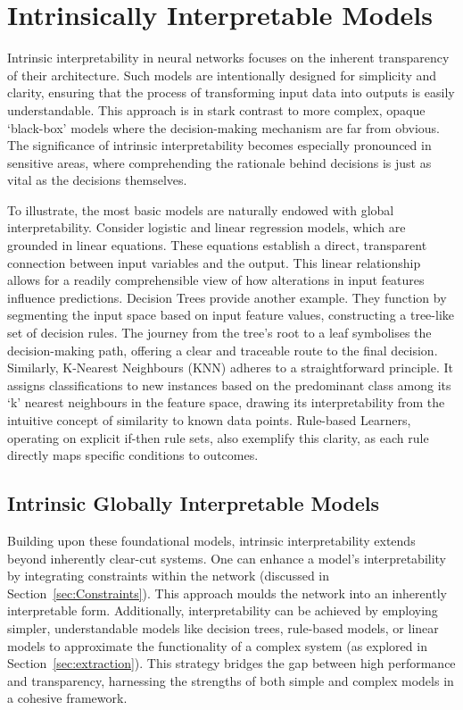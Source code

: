 \section{Intrinsically Interpretable Models}

Intrinsic interpretability in neural networks focuses on the inherent transparency of their architecture. Such models are intentionally designed for simplicity and clarity, ensuring that the process of transforming input data into outputs is easily understandable. This approach is in stark contrast to more complex, opaque `black-box' models where the decision-making mechanism are far from obvious. The significance of intrinsic interpretability becomes especially pronounced in sensitive areas, where comprehending the rationale behind decisions is just as vital as the decisions themselves.

To illustrate, the most basic models are naturally endowed with global interpretability. Consider logistic and linear regression models, which are grounded in linear equations. These equations establish a direct, transparent connection between input variables and the output. This linear relationship allows for a readily comprehensible view of how alterations in input features influence predictions. Decision Trees provide another example. They function by segmenting the input space based on input feature values, constructing a tree-like set of decision rules. The journey from the tree's root to a leaf symbolises the decision-making path, offering a clear and traceable route to the final decision. Similarly, K-Nearest Neighbours (KNN) adheres to a straightforward principle. It assigns classifications to new instances based on the predominant class among its `k' nearest neighbours in the feature space, drawing its interpretability from the intuitive concept of similarity to known data points. Rule-based Learners, operating on explicit if-then rule sets, also exemplify this clarity, as each rule directly maps specific conditions to outcomes.

\subsection{Intrinsic Globally Interpretable Models}
\label{sec:Intrinsic}

Building upon these foundational models, intrinsic interpretability extends beyond inherently clear-cut systems. One can enhance a model's interpretability by integrating constraints within the network (discussed in Section~\ref{sec:Constraints}). This approach moulds the network into an inherently interpretable form. Additionally, interpretability can be achieved by employing simpler, understandable models like decision trees, rule-based models, or linear models to approximate the functionality of a complex system (as explored in Section~\ref{sec:extraction}). This strategy bridges the gap between high performance and transparency, harnessing the strengths of both simple and complex models in a cohesive framework.

